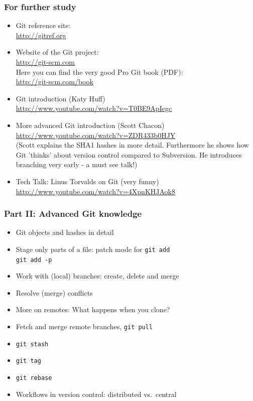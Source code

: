 \documentclass{gittalk}
\newcommand{\hlcommand}[1]{ %
\colorbox{base3}{\small \texttt{#1}}
}
\begin{document}
\begin{frame}
\frametitle{For further study}
\begin{itemize}
  \item Git reference site:\\
  \url{http://gitref.org}
  \item Website of the Git project:\\
  \url{http://git-scm.com}\\
  Here you can find the very good Pro Git book (PDF):\\
  \url{http://git-scm.com/book}
  \item Git introduction (Katy Huff)\\
        \url{http://www.youtube.com/watch?v=T0BE9ApIegc}
  \item More advanced Git introduction (Scott Chacon)\\
        \url{http://www.youtube.com/watch?v=ZDR433b0HJY}\\
        (Scott explains the SHA1 hashes in more detail. Furthermore he shows
        how Git 'thinks' about version control compared to Subversion. He
        introduces branching very early - a must see talk!)
  \item Tech Talk: Linus Torvalds on Git (very funny)\\
        \url{http://www.youtube.com/watch?v=4XpnKHJAok8}
\end{itemize}
\end{frame}

\begin{frame}
\frametitle{Part II: Advanced Git knowledge}
\begin{itemize}
  \item Git objects and hashes in detail
  \item Stage only parts of a file: patch mode for \texttt{git add} \\
  \hlcommand{git add -p}
  \item Work with (local) branches: create, delete and merge
  \item Resolve (merge) conflicts
  \item More on remotes: What happens when you clone?
  \item Fetch and merge remote branches, \hlcommand{git pull}
  \item \hlcommand{git stash}
  \item \hlcommand{git tag}
  \item \hlcommand{git rebase}
  \item Workflows in version control: distributed vs.~central
\end{itemize}
\end{frame}
\end{document}

